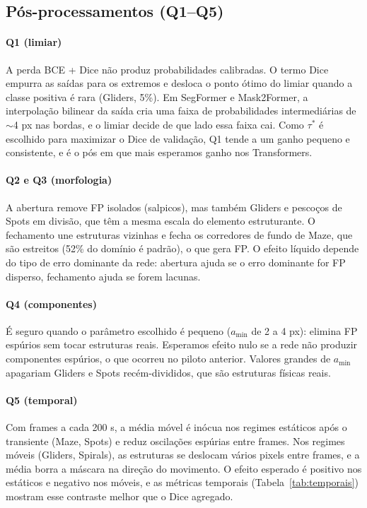 \subsection{Pós-processamentos (Q1--Q5)}
\paragraph{Q1 (limiar)} A perda BCE + Dice não produz probabilidades calibradas. O termo Dice
empurra as saídas para os extremos e desloca o ponto ótimo do limiar quando a classe positiva é
rara (Gliders, 5\%). Em SegFormer e Mask2Former, a interpolação bilinear da saída cria uma faixa de
probabilidades intermediárias de $\sim$4 px nas bordas, e o limiar decide de que lado essa faixa
cai. Como $\tau^*$ é escolhido para maximizar o Dice de validação, Q1 tende a um ganho pequeno e
consistente, e é o pós em que mais esperamos ganho nos Transformers.

\paragraph{Q2 e Q3 (morfologia)} A abertura remove FP isolados (salpicos), mas também Gliders e
pescoços de Spots em divisão, que têm a mesma escala do elemento estruturante. O fechamento une
estruturas vizinhas e fecha os corredores de fundo de Maze, que são estreitos (52\% do domínio é
padrão), o que gera FP. O efeito líquido depende do tipo de erro dominante da rede: abertura ajuda
se o erro dominante for FP disperso, fechamento ajuda se forem lacunas.

\paragraph{Q4 (componentes)} É seguro quando o parâmetro escolhido é pequeno ($a_{\min}$ de 2 a
4 px): elimina FP espúrios sem tocar estruturas reais. Esperamos efeito nulo se a rede não produzir
componentes espúrios, o que ocorreu no piloto anterior. Valores grandes de $a_{\min}$ apagariam
Gliders e Spots recém-divididos, que são estruturas físicas reais.

\paragraph{Q5 (temporal)} Com frames a cada 200 s, a média móvel é inócua nos regimes estáticos
após o transiente (Maze, Spots) e reduz oscilações espúrias entre frames. Nos regimes móveis
(Gliders, Spirals), as estruturas se deslocam vários pixels entre frames, e a média borra a máscara
na direção do movimento. O efeito esperado é positivo nos estáticos e negativo nos móveis, e as
métricas temporais (Tabela~\ref{tab:temporais}) mostram esse contraste melhor que o Dice agregado.


